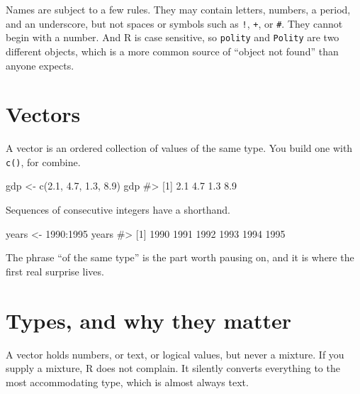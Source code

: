 \documentclass[
  a4paper,
]{scrbook}
\newenvironment{Shaded}{\begin{snugshade}}{\end{snugshade}}
\newcommand{\CommentTok}[1]{\textcolor[rgb]{0.37,0.37,0.37}{#1}}
\newcommand{\DecValTok}[1]{\textcolor[rgb]{0.68,0.00,0.00}{#1}}
\newcommand{\FloatTok}[1]{\textcolor[rgb]{0.68,0.00,0.00}{#1}}
\newcommand{\FunctionTok}[1]{\textcolor[rgb]{0.28,0.35,0.67}{#1}}
\newcommand{\NormalTok}[1]{\textcolor[rgb]{0.00,0.23,0.31}{#1}}
\newcommand{\OtherTok}[1]{\textcolor[rgb]{0.00,0.23,0.31}{#1}}
\newcommand{\SpecialCharTok}[1]{\textcolor[rgb]{0.37,0.37,0.37}{#1}}
\begin{document}
Names are subject to a few rules. They may contain letters, numbers, a
period, and an underscore, but not spaces or symbols such as \texttt{!},
\texttt{+}, or \texttt{\#}. They cannot begin with a number. And R is
case sensitive, so \texttt{polity} and \texttt{Polity} are two different
objects, which is a more common source of ``object not found'' than
anyone expects.

\section*{Vectors}\label{vectors}


A vector is an ordered collection of values of the same type. You build
one with \texttt{c()}, for combine.

\begin{Shaded}
\begin{Highlighting}[]
\NormalTok{gdp }\OtherTok{\textless{}{-}} \FunctionTok{c}\NormalTok{(}\FloatTok{2.1}\NormalTok{, }\FloatTok{4.7}\NormalTok{, }\FloatTok{1.3}\NormalTok{, }\FloatTok{8.9}\NormalTok{)}
\NormalTok{gdp}
\CommentTok{\#\textgreater{} [1] 2.1 4.7 1.3 8.9}
\end{Highlighting}
\end{Shaded}

Sequences of consecutive integers have a shorthand.

\begin{Shaded}
\begin{Highlighting}[]
\NormalTok{years }\OtherTok{\textless{}{-}} \DecValTok{1990}\SpecialCharTok{:}\DecValTok{1995}
\NormalTok{years}
\CommentTok{\#\textgreater{} [1] 1990 1991 1992 1993 1994 1995}
\end{Highlighting}
\end{Shaded}

The phrase ``of the same type'' is the part worth pausing on, and it is
where the first real surprise lives.

\section*{Types, and why they matter}\label{types-and-why-they-matter}


A vector holds numbers, or text, or logical values, but never a mixture.
If you supply a mixture, R does not complain. It silently converts
everything to the most accommodating type, which is almost always text.
\end{document}
